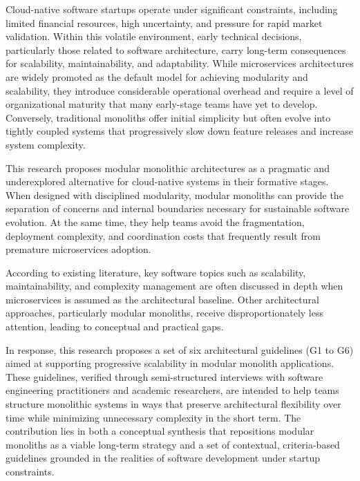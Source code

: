 Cloud-native software startups operate under significant constraints, including limited financial resources, high uncertainty, and pressure for rapid market validation. Within this volatile environment, early technical decisions, particularly those related to software architecture, carry long-term consequences for scalability, maintainability, and adaptability. While microservices architectures are widely promoted as the default model for achieving modularity and scalability, they introduce considerable operational overhead and require a level of organizational maturity that many early-stage teams have yet to develop. Conversely, traditional monoliths offer initial simplicity but often evolve into tightly coupled systems that progressively slow down feature releases and increase system complexity.

This research proposes modular monolithic architectures as a pragmatic and underexplored alternative for cloud-native systems in their formative stages. When designed with disciplined modularity, modular monoliths can provide the separation of concerns and internal boundaries necessary for sustainable software evolution. At the same time, they help teams avoid the fragmentation, deployment complexity, and coordination costs that frequently result from premature microservices adoption.

According to existing literature, key software topics such as scalability, maintainability, and complexity management are often discussed in depth when microservices is assumed as the architectural baseline. Other architectural approaches, particularly modular monoliths, receive disproportionately less attention, leading to conceptual and practical gaps.

In response, this research proposes a set of six architectural guidelines (G1 to G6) aimed at supporting progressive scalability in modular monolith applications. These guidelines, verified through semi-structured interviews with software engineering practitioners and academic researchers, are intended to help teams structure monolithic systems in ways that preserve architectural flexibility over time while minimizing unnecessary complexity in the short term. The contribution lies in both a conceptual synthesis that repositions modular monoliths as a viable long-term strategy and a set of contextual, criteria-based guidelines grounded in the realities of software development under startup constraints.
